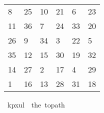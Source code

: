 \begin{isabellebody}
\begin{isamarkuptext}
\begin{table}[H]
    \begin{tabular}{llllll}
       8 & 25 & 10 & 21 &  6 & 23 \\
      11 & 36 &  7 & 24 & 33 & 20 \\
      26 &  9 & 34 &  3 & 22 &  5 \\
      35 & 12 & 15 & 30 & 19 & 32 \\
      14 & 27 &  2 & 17 &  4 & 29 \\
       1 & 16 & 13 & 28 & 31 & 18
    \end{tabular}
  \end{table}%
\end{isamarkuptext}\isamarkuptrue%
\isamarkupfalse%
\ {\isachardoublequoteopen}kp{}x{}ul\ {\isasymequiv}\ the\ {\isacharparenleft}{\kern0pt}to{\isacharunderscore}{\kern0pt}path\ \isanewline
\ \ {\isacharbrackleft}{\kern0pt}{\isacharbrackleft}{\kern0pt}{}{\isacharcomma}{\kern0pt}{}{}{\isacharcomma}{\kern0pt}{}{}{\isacharcomma}{\kern0pt}{}{}{\isacharcomma}{\kern0pt}{}{\isacharcomma}{\kern0pt}{}{}{\isacharbrackright}{\kern0pt}{\isacharcomma}{\kern0pt}\isanewline
\ \ {\isacharbrackleft}{\kern0pt}{}{}{\isacharcomma}{\kern0pt}{}{}{\isacharcomma}{\kern0pt}{}{\isacharcomma}{\kern0pt}{}{}{\isacharcomma}{\kern0pt}{}{}{\isacharcomma}{\kern0pt}{}{}{\isacharbrackright}{\kern0pt}{\isacharcomma}{\kern0pt}\isanewline
\ \ {\isacharbrackleft}{\kern0pt}{}{}{\isacharcomma}{\kern0pt}{}{\isacharcomma}{\kern0pt}{}{}{\isacharcomma}{\kern0pt}{}{\isacharcomma}{\kern0pt}{}{}{\isacharcomma}{\kern0pt}{}{\isacharbrackright}{\kern0pt}{\isacharcomma}{\kern0pt}\isanewline
\ \ {\isacharbrackleft}{\kern0pt}{}{}{\isacharcomma}{\kern0pt}{}{}{\isacharcomma}{\kern0pt}{}{}{\isacharcomma}{\kern0pt}{}{}{\isacharcomma}{\kern0pt}{}{}{\isacharcomma}{\kern0pt}{}{}{\isacharbrackright}{\kern0pt}{\isacharcomma}{\kern0pt}\isanewline
\ \ {\isacharbrackleft}{\kern0pt}{}{}{\isacharcomma}{\kern0pt}{}{}{\isacharcomma}{\kern0pt}{}{\isacharcomma}{\kern0pt}{}{}{\isacharcomma}{\kern0pt}{}{\isacharcomma}{\kern0pt}{}{}{\isacharbrackright}{\kern0pt}{\isacharcomma}{\kern0pt}\isanewline

\end{isabellebody}
